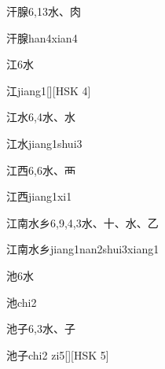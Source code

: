 \begin{entry}{汗腺}{6,13}{⽔、⾁}
  \begin{phonetics}{汗腺}{han4xian4}
  \end{phonetics}
\end{entry}

\begin{entry}{江}{6}{⽔}
  \begin{phonetics}{江}{jiang1}[][HSK 4]
  \end{phonetics}
\end{entry}

\begin{entry}{江水}{6,4}{⽔、⽔}
  \begin{phonetics}{江水}{jiang1shui3}
  \end{phonetics}
\end{entry}

\begin{entry}{江西}{6,6}{⽔、⾑}
  \begin{phonetics}{江西}{jiang1xi1}
  \end{phonetics}
\end{entry}

\begin{entry}{江南水乡}{6,9,4,3}{⽔、⼗、⽔、⼄}
  \begin{phonetics}{江南水乡}{jiang1nan2shui3xiang1}
  \end{phonetics}
\end{entry}

\begin{entry}{池}{6}{⽔}
  \begin{phonetics}{池}{chi2}
  \end{phonetics}
\end{entry}

\begin{entry}{池子}{6,3}{⽔、⼦}
  \begin{phonetics}{池子}{chi2 zi5}[][HSK 5]
  \end{phonetics}
\end{entry}

